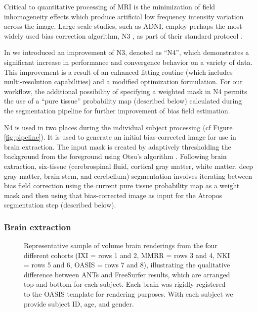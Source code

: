 Critical to quantitative processing of MRI is the minimization of
field inhomogeneity effects which produce artificial low frequency 
intensity variation across the image.  Large-scale studies, such
as ADNI, employ
perhaps the most widely used bias correction algorithm, N3 \citep{sled1998}, 
as part of their standard protocol \citep{boyes2008}.

In \cite{tustison2010} we introduced an improvement of N3, denoted as
``N4'', which demonstrates a significant increase in performance and convergence behavior on a variety of data. 
This improvement is a result of an enhanced
fitting routine (which includes multi-resolution capabilities) and a modified optimization 
formulation.  For our workflow, the additional possibility of specifying
a weighted mask in N4 permits the use of a ``pure tissue'' probability map 
(described below)
calculated during the segmentation pipeline for further improvement of 
bias field estimation.  

N4 is used in two places during the individual subject processing (cf Figure
\ref{fig:pipeline}).  
It is used to generate an initial bias-corrected image for use in
brain extraction.  The input mask is created by adaptively thresholding 
the background from the foreground using Otsu's algorithm \citep{otsu1979}.
Following brain extraction, six-tissue (cerebrospinal fluid, cortical gray 
matter, white matter, deep gray matter, brain stem, and cerebellum)
segmentation involves iterating
between bias field correction using the current pure tissue 
probability map as a weight mask and then using that bias-corrected image
as input for the Atropos segmentation step (described below).

\subsubsection{Brain extraction}

\begin{figure}
  \vspace{0mm}
  \caption{Representative sample of volume brain renderings from the four
  different cohorts (IXI = rows 1 and 2, MMRR = rows 3 and 4, 
  NKI = rows 5 and 6, OASIS = rows 7 and 8),
  illustrating the qualitative difference between ANTs and FreeSurfer 
  results, which are arranged top-and-bottom for each subject.  Each brain was rigidly
  registered to the OASIS template for rendering purposes.  With each subject
  we provide subject ID, age, and gender.
  }
  \label{fig:brainExtraction}
\end{figure}

